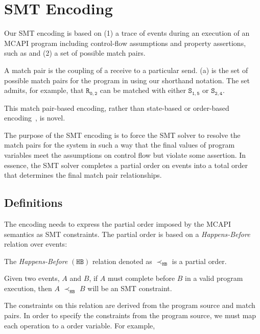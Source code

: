 \section{SMT Encoding}\label{sec:smt}

Our SMT encoding is based on (1) a trace of events during an execution
of an MCAPI program including control-flow assumptions and property
assertions, such as  and (2) a set of possible
match pairs.

A match pair is the coupling of a receive to a particular
send. (a) is the set of possible match pairs for the
program in  using our shorthand notation. The set
admits, for example, that $\mathtt{R_{0,2}}$ can be matched with
either $\mathtt{S_{1,5}}$ or $\mathtt{S_{2,4}}$.

This match pair-based encoding, rather than state-based or order-based
encoding~\cite{elwakil:padtad10,elwakil:atva10}, is novel.

The purpose of the SMT encoding is to force the SMT solver to resolve
the match pairs for the system in such a way that the final values of
program variables meet the assumptions on control flow but violate
some assertion. In essence, the SMT solver completes a partial order
on events into a total order that determines the final match pair
relationships.

\subsection{Definitions} \label{sec:smt-defns}

The encoding needs to express the partial order imposed by the MCAPI
semantics as SMT constraints. The partial order is based on a
\emph{Happens-Before} relation over events:

\begin{definition}
The \emph{Happens-Before} $(\mathtt{HB})$ relation denoted as
$\mathrm{\prec_\mathtt{HB}}$ is a partial order.
\label{def:hb}
\end{definition}

Given two events, $A$ and $B$, if $A$ must complete before $B$ in a
valid program execution, then $A$ $\mathrm{\prec_{\mathtt{HB}}}$ $B$
will be an SMT constraint.

The constraints on this relation are derived from the program source
and match pairs. In order to specify the constraints from the program
source, we must map each operation to a order variable. For example,

